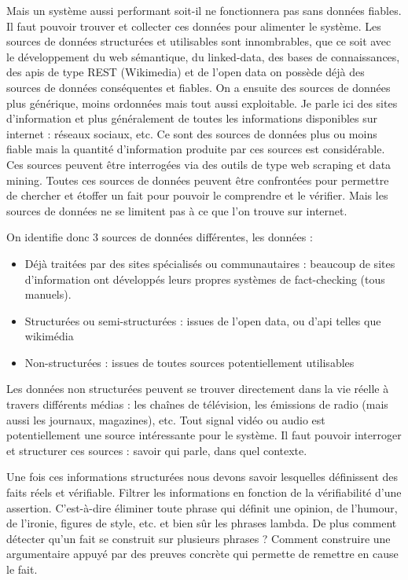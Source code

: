 \documentclass[12pt]{article}
\begin{document}
Mais un système aussi performant soit-il ne fonctionnera pas sans données fiables. Il faut pouvoir trouver et collecter ces données pour alimenter le système. Les sources de données structurées et utilisables sont innombrables, que ce soit avec le développement du web sémantique, du linked-data, des bases de connaissances, des apis de type REST (Wikimedia) et de l'open data on possède déjà des sources de données conséquentes et fiables. On a ensuite des sources de données plus générique, moins ordonnées mais tout aussi exploitable. Je parle ici des sites d'information et plus généralement de toutes les informations disponibles sur internet : réseaux sociaux, etc. Ce sont des sources de données plus ou moins fiable mais la quantité d'information produite par ces sources est considérable. Ces sources peuvent être interrogées via des outils de type web scraping et data mining.
Toutes ces sources de données peuvent être confrontées pour permettre de chercher et étoffer un fait pour pouvoir le comprendre et le vérifier.
Mais les sources de données ne se limitent pas à ce que l'on trouve sur internet.

On identifie donc 3 sources de données différentes, les données : 

\begin{itemize}
    \item Déjà traitées par des sites spécialisés ou communautaires : beaucoup de sites d'information ont développés leurs propres systèmes de fact-checking (tous manuels). 
    \item Structurées ou semi-structurées : issues de l'open data, ou d'api telles que wikimédia
    \item Non-structurées : issues de toutes sources potentiellement utilisables
\end{itemize}

Les données non structurées peuvent se trouver directement dans la vie réelle à travers différents médias : les chaînes de télévision, les émissions de radio (mais aussi les journaux, magazines), etc. Tout signal vidéo ou audio est potentiellement une source intéressante pour le système. Il faut pouvoir interroger et structurer ces sources : savoir qui parle, dans quel contexte.

Une fois ces informations structurées nous devons savoir lesquelles définissent des faits réels et vérifiable. Filtrer les informations en fonction de la vérifiabilité d'une assertion. C'est-à-dire éliminer toute phrase qui définit une opinion, de l'humour, de l'ironie, figures de style, etc. et bien sûr les phrases lambda. De plus comment détecter qu'un fait se construit sur plusieurs phrases ? Comment construire une argumentaire appuyé par des preuves concrète qui permette de remettre en cause le fait.
\end{document}

